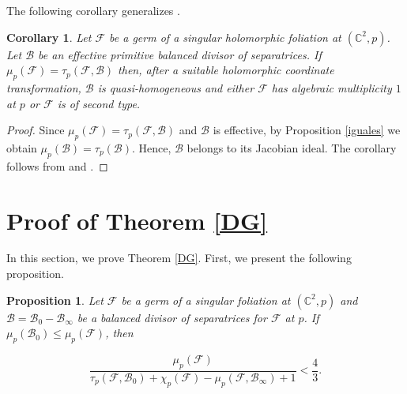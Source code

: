 \documentclass[11pt]{amsart}
\newcommand{\C}{\mathbb{C}}
\newcommand{\F}{\mathcal{F}}
\newcommand{\B}{\mathcal{B}}
\newtheorem{proposition}[theorem]{Proposition}
\newtheorem{corollary}[theorem]{Corollary}
\begin{document}
\par The following corollary generalizes \cite[Corollaries 3.4]{FS-GB-SM}.
\begin{corollary} \label{cor:iguales}
Let $\F$ be a germ of a singular holomorphic foliation  at $(\C^2,p)$. Let $\B$ be an effective primitive balanced divisor of separatrices. If $\mu_p(\F)=\tau_p(\F,\B)$ then, after a suitable holomorphic
coordinate transformation, $\B$ is quasi-homogeneous and either $\F$   has algebraic multiplicity $1$ at $p$ or $\F$ is of second type.
\end{corollary}
\begin{proof}
Since $\mu_p(\F)=\tau_p(\F,\B)$ and $\B$ is effective, by Proposition \ref{iguales} we obtain $\mu_p(\B)=\tau_p(\B)$. Hence, $\B$ belongs to its Jacobian ideal. The corollary follows from \cite[Proposition 3.1 (3)]{FP-GB-SM2021} and \cite[Satz p.123, (a) and (d)]{Saito}.
\end{proof}

\section{Proof of Theorem \ref{DG}}\label{principal}
In this section, we prove Theorem \ref{DG}. First, we present the following proposition.
\begin{proposition}\label{xi}
Let $\F$ be a germ of a singular foliation  at $(\C^2,p)$ and $\B=\B_0-\B_{\infty}$ be a balanced divisor of separatrices for $\F$ at $p$.  If $\mu_{p}(\mathcal{B}_{0}) \leq \mu_{p}(\mathcal{F})$,  then

\begin{equation}\label{ec1}
\frac{\mu_{p}(\mathcal{F})}{\tau_{p}(\mathcal{F},\mathcal{B}_{0})+\chi_{p}(\mathcal{F})-\mu_p(\F,\B_{\infty})+1}<\frac{4}{3}.
\end{equation}
\end{proposition}
\end{document}
